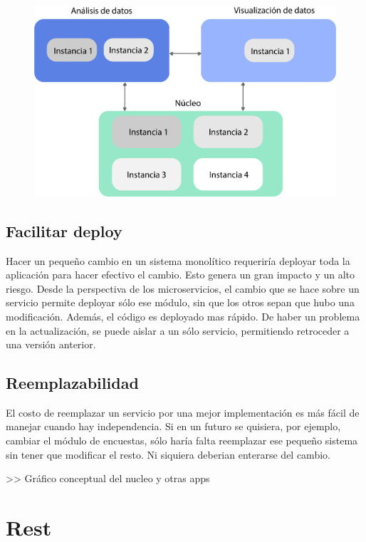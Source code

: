 \begin{figure}[h!]
  \centering
    \includegraphics[scale=0.7]{images/escalamiento.png}
  \label{fig:microescala}
\end{figure}

\subsection[Facilitar deploy]{Facilitar deploy}

Hacer un pequeño cambio en un sistema monolítico requeriría deployar toda la aplicación para hacer efectivo el cambio. Esto genera un gran impacto y un alto riesgo. 
Desde la perspectiva de los microservicios, el cambio que se hace sobre un servicio permite deployar sólo ese módulo, sin que los otros sepan que hubo una modificación. Además, el código es deployado mas rápido. 
De haber un problema en la actualización, se puede aislar a un sólo servicio, permitiendo retroceder a una versión anterior.

\subsection[Reemplazabilidad]{Reemplazabilidad}

El costo de reemplazar un servicio por una mejor implementación es más fácil de manejar cuando hay independencia. 
Si en un futuro se quisiera, por ejemplo, cambiar el módulo de encuestas, sólo haría falta reemplazar ese pequeño sistema sin tener que modificar el resto. Ni siquiera deberian enterarse del cambio.

>> Gráfico conceptual del nucleo y otras apps

\section[REST]{Rest}

